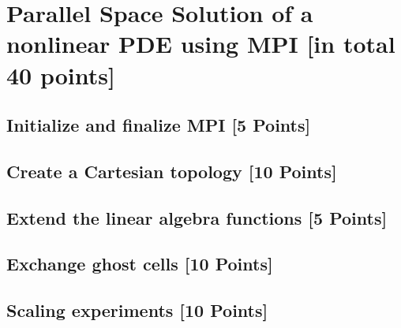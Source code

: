\documentclass[unicode,11pt,a4paper,oneside,numbers=endperiod,openany]{scrartcl}
\begin{document}
\setassignment
{}

\newline

\assignmentpolicy


\section{Parallel Space Solution of a nonlinear PDE using MPI [in total 40 points]}

\subsection{Initialize and finalize MPI [5 Points]}

\subsection{Create a Cartesian topology [10 Points]}

\subsection{Extend the linear algebra functions [5 Points]}

\subsection{Exchange ghost cells [10 Points]}

\subsection{Scaling experiments [10 Points]}


\end{document}
